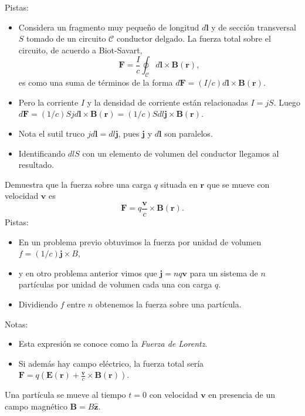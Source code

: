 \documentclass{exam}
\begin{document}
\begin{questions}
    Pistas:
    \begin{itemize}
    \item Considera un fragmento muy pequeño de
      longitud $d\bm l$ y de sección transversal $S$ tomado de un circuito $\mathcal
      C$ conductor delgado. La fuerza total
      sobre el circuito, de acuerdo a Biot-Savart,
      $$
      \bm F=\frac{I}{c}\oint_{\mathcal C} d\bm l\times\bm B(\bm r),
      $$
      es como una suma de términos de la forma
      $d\bm F=(I/c)d\bm l\times \bm B(\bm r)$.
    \item Pero la corriente $I$ y
      la densidad de corriente están relacionadas $I=jS$. Luego
      $d\bm F=(1/c)S j d\bm l\times \bm B(\bm r)=(1/c)S dl \bm j
      \times \bm B(\bm r)$.
    \item Nota el sutil truco $jd\bm l=dl\bm j$, pues $\bm j$ y $d\bm
      l$ son paralelos.
    \item Identificando $dlS$ con un elemento de volumen del conductor
      llegamos al resultado.
    \end{itemize}
  \question Demuestra que la fuerza sobre una carga $q$ situada en
    $\bm r$ que se mueve con velocidad $\bm v$ es
    $$
    \bm F=q\frac{\bm v}{c}\times\bm B(\bm r).
    $$
    Pistas:
    \begin{itemize}
    \item En un problema previo obtuvimos la fuerza por unidad de
      volumen $f=(1/c)\bm j\times B$,
    \item y en otro problema anterior vimos que $\bm j=nq\bm v$ para
      un sistema de $n$ partículas por unidad de volumen cada una con
      carga $q$.
    \item Dividiendo $f$ entre $n$ obtenemos la fuerza sobre una partícula.
    \end{itemize}
    Notas:
    \begin{itemize}
    \item Esta expresión se conoce como la {\em Fuerza de Lorentz}.
    \item Si además hay campo eléctrico, la fuerza total sería $\bm
      F=q(\bm E(\bm r)+\frac{\bm v}{c}\times\bm B(\bm r))$.
    \end{itemize}

  \question Una partícula se mueve al tiempo $t=0$ con velocidad $\bm v$ en presencia
    de un campo magnético $\bm B=B\hat{\bm z}$.
\end{questions}
\end{document}
